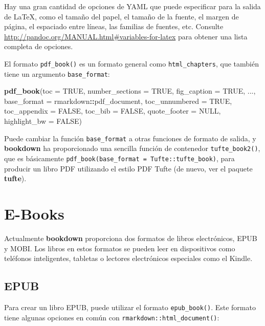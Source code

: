 \documentclass[12pt,]{krantz}
\makeatletter
\newenvironment{Shaded}{\begin{snugshade}}{\end{snugshade}}
\newcommand{\KeywordTok}[1]{\textcolor[rgb]{0.13,0.29,0.53}{\textbf{#1}}}
\newcommand{\DataTypeTok}[1]{\textcolor[rgb]{0.13,0.29,0.53}{#1}}
\newcommand{\OtherTok}[1]{\textcolor[rgb]{0.56,0.35,0.01}{#1}}
\newcommand{\OperatorTok}[1]{\textcolor[rgb]{0.81,0.36,0.00}{\textbf{#1}}}
\newcommand{\NormalTok}[1]{#1}
\newenvironment{kframe}{%
\medskip{}
\setlength{\fboxsep}{.8em}
 \def\at@end@of@kframe{}%
 \ifinner\ifhmode%
  \def\at@end@of@kframe{\end{minipage}}%
  \begin{minipage}{\columnwidth}%
 \fi\fi%
 \def\FrameCommand##1{\hskip\@totalleftmargin \hskip-\fboxsep
 \colorbox{shadecolor}{##1}\hskip-\fboxsep
     \hskip-\linewidth \hskip-\@totalleftmargin \hskip\columnwidth}%
 \MakeFramed {\advance\hsize-\width
   \@totalleftmargin\z@ \linewidth\hsize
   \@setminipage}}%
 {\par\unskip\endMakeFramed%
 \at@end@of@kframe}
\renewenvironment{Shaded}{\begin{kframe}}{\end{kframe}}
\theoremstyle{definition}
\theoremstyle{definition}
\theoremstyle{definition}
\theoremstyle{remark}
\makeatother
\begin{document}
Hay una gran cantidad de opciones de YAML que puede especificar para la
salida de LaTeX, como el tamaño del papel, el tamaño de la fuente, el
margen de página, el espaciado entre líneas, las familias de fuentes,
etc. Consulte \url{http://pandoc.org/MANUAL.html\#variables-for-latex}
para obtener una lista completa de opciones.

El formato \texttt{pdf\_book()} es un formato general como
\texttt{html\_chapters}, que también tiene un argumento
\texttt{base\_format}:

\begin{Shaded}
\begin{Highlighting}[]
\KeywordTok{pdf_book}\NormalTok{(}\DataTypeTok{toc =} \OtherTok{TRUE}\NormalTok{, }\DataTypeTok{number_sections =} \OtherTok{TRUE}\NormalTok{,}
  \DataTypeTok{fig_caption =} \OtherTok{TRUE}\NormalTok{, ...,}
  \DataTypeTok{base_format =}\NormalTok{ rmarkdown}\OperatorTok{::}\NormalTok{pdf_document,}
  \DataTypeTok{toc_unnumbered =} \OtherTok{TRUE}\NormalTok{, }\DataTypeTok{toc_appendix =} \OtherTok{FALSE}\NormalTok{,}
  \DataTypeTok{toc_bib =} \OtherTok{FALSE}\NormalTok{, }\DataTypeTok{quote_footer =} \OtherTok{NULL}\NormalTok{,}
  \DataTypeTok{highlight_bw =} \OtherTok{FALSE}\NormalTok{)}
\end{Highlighting}
\end{Shaded}

Puede cambiar la función \texttt{base\_format} a otras funciones de
formato de salida, y \textbf{bookdown} ha proporcionado una sencilla
función de contenedor \texttt{tufte\_book2()}, que es básicamente
\texttt{pdf\_book(base\_format\ =\ Tufte::tufte\_book)}, para producir
un libro PDF utilizando el estilo PDF Tufte (de nuevo, ver el paquete
\textbf{tufte}).

\section{E-Books}\label{e-books}

Actualmente \textbf{bookdown} proporciona dos formatos de libros
electrónicos, EPUB y MOBI. Los libros en estos formatos se pueden leer
en dispositivos como teléfonos inteligentes, tabletas o lectores
electrónicos especiales como el Kindle.

\subsection{EPUB}\label{epub}

Para crear un libro EPUB, puede utilizar el formato
\texttt{epub\_book()}. Este formato tiene algunas opciones en común con
\texttt{rmarkdown::html\_document()}:
\end{document}
